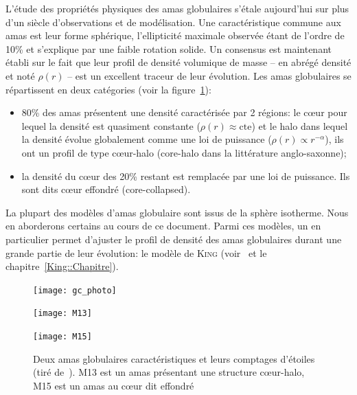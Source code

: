 			L'étude des propriétés physiques des amas globulaires s'étale aujourd'hui sur plus d'un siècle d'observations et de
			modélisation. Une caractéristique commune aux amas est leur forme sphérique, l'ellipticité maximale observée étant de l'ordre
			de 10\% et s'explique par une faible rotation solide. Un consensus est maintenant établi sur le fait que leur profil de
			densité volumique de masse -- en abrégé densité et noté $\rho(r)$ -- est un excellent traceur de leur évolution. Les amas
			globulaires se répartissent en deux catégories (voir la figure~\ref{Fig::Intro::images}):
			\begin{itemize}

				\item 80\% des amas présentent une densité caractérisée par 2 régions: le cœur pour lequel la densité est quasiment
					constante ($\rho(r) \approx \mathrm{cte}$) et le halo dans lequel la densité évolue globalement comme une loi
					de puissance ($\rho(r) \propto r^{-\alpha}$), ils ont un profil de type cœur-halo (core-halo dans la
					littérature anglo-saxonne);

				\item la densité du cœur des 20\% restant est remplacée par une loi de puissance. Ils sont dits cœur effondré
					(core-collapsed).

			\end{itemize}

			La plupart des modèles d'amas globulaire sont issus de la sphère isotherme. Nous en
			aborderons certains au cours de ce document. Parmi ces modèles, un en particulier
			permet d'ajuster le profil de densité des amas globulaires durant une grande
			partie de leur évolution: le modèle de \textsc{King}
			(voir~\cite{1966AJ.....71...64K} et le chapitre~\ref{King::Chapitre}).

			\begin{figure}[h]
				\begin{center}
					\texttt{[image: gc\_photo]}
				\end{center}
				\begin{minipage}{0.45\textwidth}
					\begin{center}
						\texttt{[image: M13]}
					\end{center}
				\end{minipage}\hfill
				\begin{minipage}{0.45\textwidth}
					\begin{center}
						\texttt{[image: M15]}
					\end{center}
				\end{minipage}
				\caption{\label{Fig::Intro::images}Deux amas globulaires
					caractéristiques et leurs comptages d'étoiles (tiré de~\cite{2010A&A...522A..71J}).
					M13 est un amas présentant une structure cœur-halo,
					M15 est un amas au cœur dit effondré}
			\end{figure}

